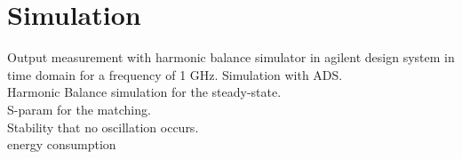 \chapter{Simulation}
Output measurement with harmonic balance simulator in agilent design system in time domain for a frequency of 1 GHz.
Simulation  with ADS. \\Harmonic Balance simulation for the steady-state.\\ S-param for the matching.\\ Stability that no oscillation occurs. \\ energy consumption\\